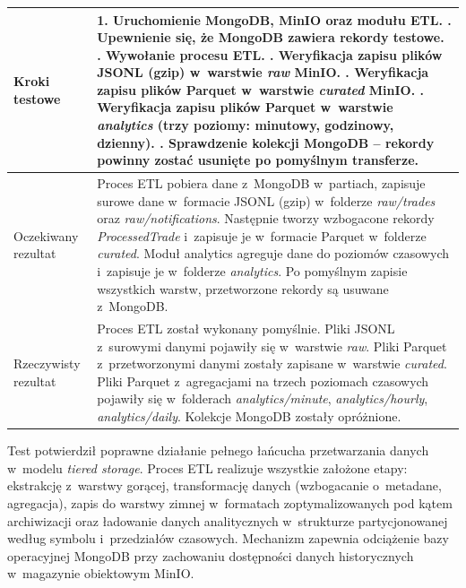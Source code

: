 \begin{table}[H]
\begin{tabular}{|p{}|p{}|}
        Kroki testowe        & 1. Uruchomienie MongoDB, MinIO oraz modułu ETL\@. \newline 2. Upewnienie się, że MongoDB zawiera rekordy testowe. \newline 3. Wywołanie procesu ETL. \newline 4. Weryfikacja zapisu plików JSONL (gzip) w~warstwie \textit{raw} MinIO\@. \newline 5. Weryfikacja zapisu plików Parquet w~warstwie \textit{curated} MinIO\@. \newline 6. Weryfikacja zapisu plików Parquet w~warstwie \textit{analytics} (trzy poziomy: minutowy, godzinowy, dzienny). \newline 7. Sprawdzenie kolekcji MongoDB -- rekordy powinny zostać usunięte po pomyślnym transferze. \\ \hline
        Oczekiwany rezultat  & Proces ETL pobiera dane z~MongoDB w~partiach, zapisuje surowe dane w~formacie JSONL (gzip) w~folderze \textit{raw/trades} oraz \textit{raw/notifications}. Następnie tworzy wzbogacone rekordy \textit{ProcessedTrade} i~zapisuje je w~formacie Parquet w~folderze \textit{curated}. Moduł analytics agreguje dane do poziomów czasowych i~zapisuje je w~folderze \textit{analytics}. Po pomyślnym zapisie wszystkich warstw, przetworzone rekordy są usuwane z~MongoDB.                                                                                   \\ \hline
        Rzeczywisty rezultat & Proces ETL został wykonany pomyślnie. Pliki JSONL z~surowymi danymi pojawiły się w~warstwie \textit{raw}. Pliki Parquet z~przetworzonymi danymi zostały zapisane w~warstwie \textit{curated}. Pliki Parquet z~agregacjami na trzech poziomach czasowych pojawiły się w~folderach \textit{analytics/minute}, \textit{analytics/hourly}, \textit{analytics/daily}. Kolekcje MongoDB zostały opróżnione.                                                                                                                                                      \\ \hline
    \end{tabular}
\end{table}

Test potwierdził poprawne działanie pełnego łańcucha przetwarzania danych w~modelu \textit{tiered storage}.
Proces ETL realizuje wszystkie założone etapy: ekstrakcję z~warstwy gorącej, transformację danych (wzbogacanie
o~metadane, agregacja), zapis do warstwy zimnej w~formatach zoptymalizowanych pod kątem archiwizacji oraz ładowanie
danych analitycznych w~strukturze partycjonowanej według symbolu i~przedziałów czasowych.
Mechanizm zapewnia odciążenie bazy operacyjnej MongoDB przy zachowaniu dostępności danych historycznych w~magazynie
obiektowym MinIO\@.
